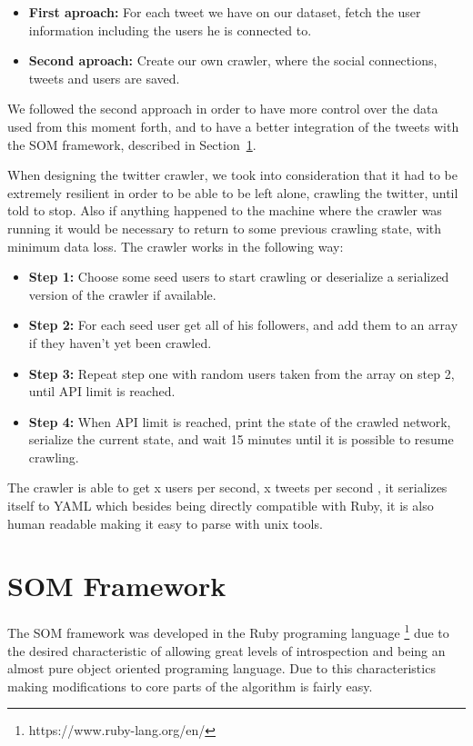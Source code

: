 \begin{itemize}
  \item \textbf{First aproach: } For each tweet we have on our dataset, fetch the user information including the users he is connected to.
  \item \textbf{Second aproach: } Create our own crawler, where the social connections, tweets and users are saved.
\end{itemize}                                                                                             
We followed the second approach in order to have more control over the data used from this moment forth, and to have a better integration of the tweets with the \ac{SOM} framework, described in Section~\ref{sec:som_framework}.

When designing the twitter crawler, we took into consideration that it had to be extremely resilient in order to be able to be left alone, crawling the twitter, until told to stop. Also if anything happened to the machine where the crawler was running it would be necessary to return to some previous crawling state, with minimum data loss. The crawler works in the following way:

\begin{itemize}
  \item \textbf{Step 1:} Choose some seed users to start crawling or deserialize a serialized version of the crawler if available.
  \item \textbf{Step 2:} For each seed user get all of his followers, and add them to an array if they haven't yet been crawled.
  \item \textbf{Step 3:} Repeat step one with random users taken from the array on step 2, until API limit is reached.
  \item \textbf{Step 4:} When API limit is reached, print the state of the crawled network, serialize the current state, and wait 15 minutes until it is possible to resume crawling. 
\end{itemize}

The crawler is able to get {\color{red} x users per second, x tweets per second }, it serializes itself to \ac{YAML} which besides being directly compatible with Ruby, it is also human readable making it easy to parse with unix tools.


\section{SOM Framework}
\label{sec:som_framework}
The \ac{SOM} framework was developed in the Ruby programing language \footnote{https://www.ruby-lang.org/en/} due to the desired characteristic of allowing great levels of introspection and being an almost pure object oriented programing language. Due to this characteristics making modifications to core parts of the algorithm is fairly easy.

